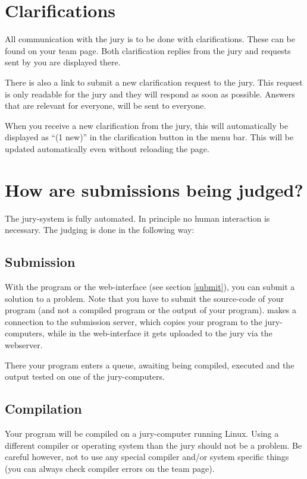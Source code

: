 \section{Clarifications}

All communication with the jury is to be done with clarifications.
These can be found on your team page. Both clarification replies from
the jury and requests sent by you are displayed there.

There is also a link to submit a new clarification request to the
jury. This request is only readable for the jury and they will respond
as soon as possible. Answers that are relevant for everyone, will be
sent to everyone.

When you receive a new clarification from the jury, this will
automatically be displayed as ``(1 new)'' in the clarification button
in the menu bar. This will be updated automatically even without reloading
the page.

\section{How are submissions being judged?}

The \DOMjudge jury-system is fully automated. In principle no human
interaction is necessary. The judging is done in the following way:

\subsection{Submission}

With the  program or the web-interface (see section
\ref{submit}), you can submit a solution to a problem. Note that you
have to submit the source-code of your program (and not a compiled
program or the output of your program).  makes a
connection to the submission server, which copies your program to the
jury-computers, while in the web-interface it gets uploaded to the
jury via the webserver.

There your program enters a queue, awaiting being compiled, executed
and the output tested on one of the jury-computers.

\subsection{Compilation}

Your program will be compiled on a jury-computer running Linux.
Using a different compiler or operating system than the jury should
not be a problem. Be careful however, not to use any special compiler
and/or system specific things (you can always check compiler errors on
the team page).

